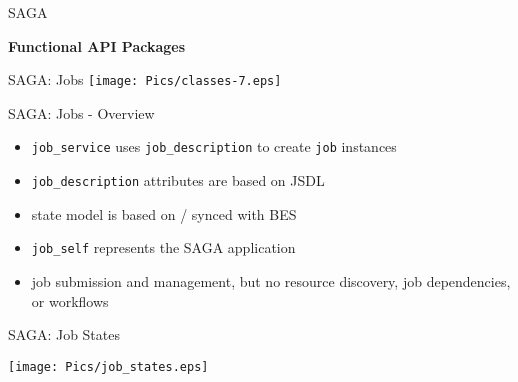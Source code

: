 \documentclass[%
  pdf,
  colorBG,
  slideColor,
  frames,
  ogf
]{prosper}
\newcommand{\T}[1]{\texttt{#1}}
\newcommand{\B}[1]{\textbf{#1}}
\newcommand{\dn}{\vspace*{+1em}}
\begin{document}

 \begin{slide}{SAGA}
   
   \dn\dn\dn\dn\dn 
   
   \begin{center}
   
     \B{\large Functional API Packages}

   \end{center}

 \end{slide}


 \begin{slide}{SAGA: Jobs}
   \texttt{[image: Pics/classes-7.eps]}
 \end{slide}


 \begin{slide}{SAGA: Jobs - Overview}

 \dn 

  \begin{itemize}
   \item \T{job\_service} uses \T{job\_description} to create \T{job} instances
   \item \T{job\_description} attributes are based on JSDL 
   \item state model is based on / synced with BES
   \item \T{job\_self} represents the SAGA application
   \item job submission and management, but no resource discovery, job
   dependencies, or workflows
  \end{itemize}

 \end{slide}


 \begin{slide}{SAGA: Job States}
  \begin{center}
   \texttt{[image: Pics/job\_states.eps]}
  \end{center}
 \end{slide}

\end{document}
